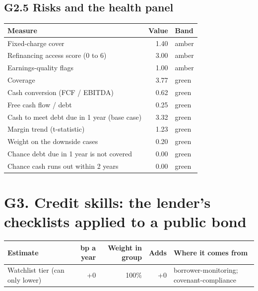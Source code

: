 \documentclass[11pt,a4paper]{article}
\begin{document}
\subsection*{G2.5 Risks and the health panel}
\begin{center}\footnotesize\setlength{\tabcolsep}{3.5pt}\begin{tabular}{@{}lrl@{}}\toprule
Measure & Value & Band \\\midrule
Fixed-charge cover & 1.40 & \textcolor{amber}{amber} \\
Refinancing access score (0 to 6) & 3.00 & \textcolor{amber}{amber} \\
Earnings-quality flags & 1.00 & \textcolor{amber}{amber} \\
Coverage & 3.77 & \textcolor{good}{green} \\
Cash conversion (FCF / EBITDA) & 0.62 & \textcolor{good}{green} \\
Free cash flow / debt & 0.25 & \textcolor{good}{green} \\
Cash to meet debt due in 1 year (base case) & 3.32 & \textcolor{good}{green} \\
Margin trend (t-statistic) & 1.23 & \textcolor{good}{green} \\
Weight on the downside cases & 0.20 & \textcolor{good}{green} \\
Chance debt due in 1 year is not covered & 0.00 & \textcolor{good}{green} \\
Chance cash runs out within 2 years & 0.00 & \textcolor{good}{green} \\
\bottomrule\end{tabular}\end{center}
\section*{G3. Credit skills: the lender's checklists applied to a public bond}
\par\noindent{}
\begin{center}\footnotesize\setlength{\tabcolsep}{3.5pt}\begin{tabular}{@{}p{6.2cm}rrrp{4.2cm}@{}}\toprule
Estimate & bp a year & Weight in group & Adds & Where it comes from \\\midrule
Watchlist tier (can only lower) & +0 & 100\% & +0 & borrower-monitoring; covenant-compliance \\
\bottomrule\end{tabular}\end{center}
\end{document}
